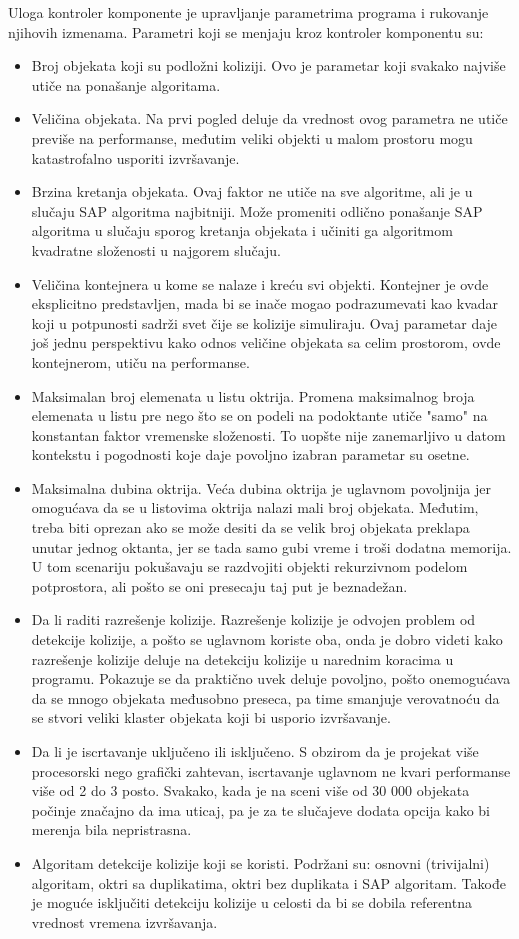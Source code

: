 \documentclass[12pt,oneside]{memoir}
\begin{document}
Uloga kontroler komponente je upravljanje parametrima programa i rukovanje njihovih izmenama.
Parametri koji se menjaju kroz kontroler komponentu su: 
\begin{itemize}  
	\item Broj objekata koji su podložni koliziji. 
	Ovo je parametar koji svakako najviše utiče na ponašanje algoritama.
	\item Veličina objekata. 
	Na prvi pogled deluje da vrednost ovog parametra ne utiče previše na performanse, međutim veliki objekti u malom prostoru mogu katastrofalno usporiti izvršavanje.
	\item Brzina kretanja objekata.
	Ovaj faktor ne utiče na sve algoritme, ali je u slučaju SAP algoritma najbitniji. Može promeniti odlično ponašanje SAP algoritma u slučaju sporog kretanja 
	objekata i učiniti ga algoritmom kvadratne složenosti u najgorem slučaju.
	\item Veličina kontejnera u kome se nalaze i kreću svi objekti. Kontejner je ovde eksplicitno predstavljen, mada bi se inače mogao podrazumevati kao kvadar 
	koji u potpunosti sadrži svet čije se kolizije simuliraju.
	Ovaj parametar daje još jednu perspektivu kako odnos veličine objekata sa celim prostorom, ovde kontejnerom, utiču na performanse.
	\item Maksimalan broj elemenata u listu oktrija.
	Promena maksimalnog broja elemenata u listu pre nego što se on podeli na podoktante utiče "samo" na konstantan faktor vremenske složenosti.
	To uopšte nije zanemarljivo u datom kontekstu i pogodnosti koje daje povoljno izabran parametar su osetne.
	\item Maksimalna dubina oktrija. Veća dubina oktrija je uglavnom povoljnija jer omogućava da se u listovima oktrija nalazi mali broj objekata.
	Međutim, treba biti oprezan ako se može desiti 
	da se velik broj objekata preklapa unutar jednog oktanta, jer se tada samo gubi vreme i troši dodatna memorija. 
	U tom scenariju pokušavaju se razdvojiti objekti rekurzivnom podelom potprostora, ali pošto se oni presecaju taj put je beznadežan.
	\item Da li raditi razrešenje kolizije. 
	Razrešenje kolizije je odvojen problem od detekcije kolizije, a pošto se uglavnom koriste oba, onda je dobro videti 
	kako razrešenje kolizije deluje na detekciju kolizije u narednim koracima u programu. Pokazuje se da praktično uvek deluje povoljno, pošto onemogućava da se mnogo 
	objekata međusobno preseca, pa time smanjuje verovatnoću da se stvori veliki klaster objekata koji bi usporio izvršavanje.
	\item Da li je iscrtavanje uključeno ili isključeno. 
	S obzirom da je projekat više procesorski nego grafički zahtevan, iscrtavanje uglavnom ne kvari performanse više od 2 do 3 posto.
	Svakako, kada je na sceni više od 30 000 objekata počinje značajno da ima uticaj, pa je za te slučajeve dodata opcija kako bi merenja bila nepristrasna.
	\item Algoritam detekcije kolizije koji se koristi. Podržani su: osnovni (trivijalni) algoritam, oktri sa duplikatima,
	oktri bez duplikata i SAP algoritam. Takođe je moguće isključiti detekciju kolizije u celosti da bi se dobila referentna vrednost vremena izvršavanja.


\end{itemize}
\end{document}
